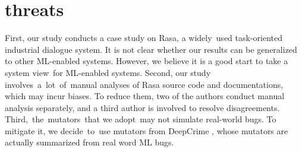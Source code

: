 \section{threats}
\vspace{-3pt}

First, our study conducts a case study on Rasa, a widely~used task-oriented industrial dialogue system. It is not clear whether our results can be generalized to other ML-enabled systems. However, we believe it is a good start to take a system view~for ML-enabled systems. Second, our study involves~a~lot~of~manual analyses of Rasa source code and documentations, which may incur biases. To reduce them, two of the authors conduct manual analysis separately, and a third author is involved to resolve disagreements. Third,~the~mutators~that we adopt~may not simulate real-world bugs. To mitigate it,  we decide~to~use mutators from DeepCrime \cite{DeepCrime}, whose mutators are actually summarized from real word ML bugs. 
